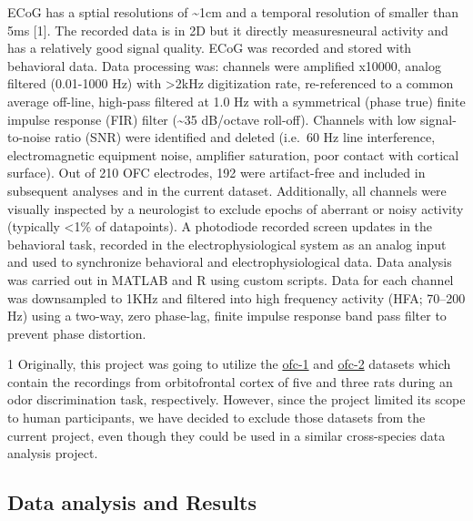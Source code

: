 \documentclass[11pt]{article}
\begin{document}
ECoG has a sptial resolutions of \textasciitilde{}1cm and a temporal
resolution of smaller than 5ms {[}1{]}. The recorded data is in 2D but
it directly measuresneural activity and has a relatively good signal
quality. ECoG was recorded and stored with behavioral data. Data
processing was: channels were amplified x10000, analog filtered
(0.01-1000 Hz) with \textgreater{}2kHz digitization rate, re-referenced
to a common average off-line, high-pass filtered at 1.0 Hz with a
symmetrical (phase true) finite impulse response (FIR) filter
(\textasciitilde{}35 dB/octave roll-off). Channels with low
signal-to-noise ratio (SNR) were identified and deleted (i.e.~60 Hz line
interference, electromagnetic equipment noise, amplifier saturation,
poor contact with cortical surface). Out of 210 OFC electrodes, 192 were
artifact-free and included in subsequent analyses and in the current
dataset. Additionally, all channels were visually inspected by a
neurologist to exclude epochs of aberrant or noisy activity (typically
\textless{}1\% of datapoints). A photodiode recorded screen updates in
the behavioral task, recorded in the electrophysiological system as an
analog input and used to synchronize behavioral and electrophysiological
data. Data analysis was carried out in MATLAB and R using custom
scripts. Data for each channel was downsampled to 1KHz and filtered into
high frequency activity (HFA; 70--200 Hz) using a two-way, zero
phase-lag, finite impulse response band pass filter to prevent phase
distortion.

1 Originally, this project was going to utilize the
\href{http://crcns.org/data-sets/ofc/ofc-1/about-ofc-1}{ofc-1} and
\href{http://crcns.org/data-sets/ofc/ofc-2/about-ofc-2}{ofc-2} datasets
which contain the recordings from orbitofrontal cortex of five and three
rats during an odor discrimination task, respectively. However, since
the project limited its scope to human participants, we have decided to
exclude those datasets from the current project, even though they could
be used in a similar cross-species data analysis project.

    \hypertarget{data-analysis-and-results}{%
\subsection{Data analysis and Results}\label{data-analysis-and-results}}
\end{document}
